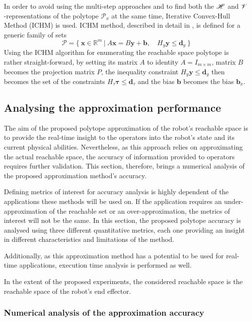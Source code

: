 In order to avoid using the multi-step approaches and to find both the $\mathscr{H}$ and $\mathscr{V}$-representations of the polytope $\mathcal{P}_x$ at the same time, Iterative Convex-Hull Method (ICHM) is used. ICHM method, described in detail in , is defined for a generic family of sets
\begin{equation}
\mathcal{P} = \{ ~\bm{x}\in \mathbb{R}^{m} ~|~ A\bm{x} = B\bm{y} + \bm{b},\quad H_y\bm{y} \leq \bm{d}_y~\}
\end{equation}
Using the ICHM algorithm for enumerating the reachable space polytope is rather straight-forward, by setting its matrix $A$ to identity $A=I_{m \times m}$, matrix $B$ becomes the projection matrix $P$, the inequality constraint $H_y\bm{y} \leq \bm{d}_y$ then becomes the set of the constraints $H_\tau\bm{\tau}\leq\bm{d}_\tau$ and the bias $\bm{b}$ becomes the bias $\bm{b}_x$.


\subsection{Analysing the approximation performance}
\label{ch:analysis}

The aim of the proposed polytope approximation of the robot's reachable space is to provide the real-time insight to the operators into the robot's state and its current physical abilities. 
Nevertheless, as this approach relies on approximating the actual reachable space, 
the accuracy of information provided to operators requires further validation. 
This section, therefore, brings a numerical analysis of the proposed approximation method's accuracy. 

Defining metrics of interest for accuracy analysis is highly dependent of the applications these methods will be used on. If the application requires an under-approximation of the reachable set or an over-approximation, the metrics of interest will not be the same. In this section, the proposed polytope accuracy is analysed using three different quantitative metrics, each one providing an insight in different characteristics and limitations of the method. 

Additionally, as this approximation method has a potential to be used for real-time applications, execution time analysis is performed as well. 

In the extent of the proposed experiments, the considered reachable space is the reachable space of the robot's end effector. 

\subsubsection{Numerical analysis of the approximation accuracy}

